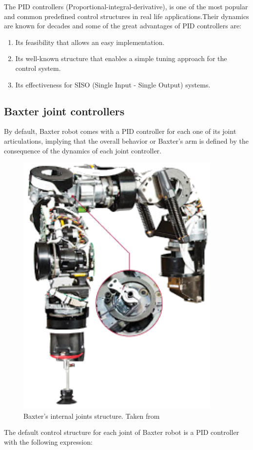 \documentclass[11pt]{report} %
\begin{document}
The PID controllers (Proportional-integral-derivative), is one of the most popular and common predefined control structures in real life applications.Their dynamics are known for decades and some of the great advantages of PID controllers are:

\begin{enumerate}
    \item Its feasibility that allows an easy implementation.
    \item Its well-known structure that enables a simple tuning approach for the control system.
    \item Its effectiveness for SISO (Single Input - Single Output) systems. 
\end{enumerate}

\subsection{Baxter joint controllers}

By default, Baxter robot comes with a PID controller for each one of its joint articulations, implying that the overall behavior or Baxter's arm is defined by the consequence of the dynamics of each joint controller.\\

\begin{figure}[H]
    \centering
    \includegraphics[width=0.5\linewidth]{assets/imgs/control_theory/baxter_joint.png}
    \caption{Baxter's internal joints structure. Taken from \citep{cite_baxter_arms_wiki}} 
    \label{fig_baxter_internal_joint_structure}
\end{figure}

The default control structure for each joint of Baxter robot is a PID controller with the following expression:
\end{document}
